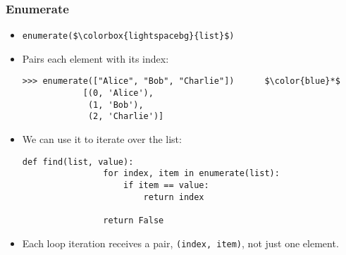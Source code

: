 \documentclass[notes]{beamer}
\begin{document}
%		
%				
%				
%			
%			
%				
%				
%				
%	

	\begin{frame}[fragile]
		\frametitle{Enumerate}
		
		\begin{itemize}
			\item \lstinline|enumerate($\colorbox{lightspacebg}{list}$)|
			
			\item Pairs each element with its index:
			\begin{lstlisting}[xleftmargin=\dimexpr-\leftmargini]
			>>> enumerate(["Alice", "Bob", "Charlie"])      $\color{blue}*$
			[(0, 'Alice'),
			 (1, 'Bob'),
			 (2, 'Charlie')]
			\end{lstlisting}
			
			\item We can use it to iterate over the list: 
			\begin{lstlisting}[xleftmargin=\dimexpr-\leftmargini]
			def find(list, value):
			    for index, item in enumerate(list):
			        if item == value:
			            return index
			
			    return False
			\end{lstlisting}
			
			\item Each loop iteration receives a pair, \lstinline|(index, item)|, not just one element.
		\end{itemize}
		
	\end{frame}
	
\end{document}
